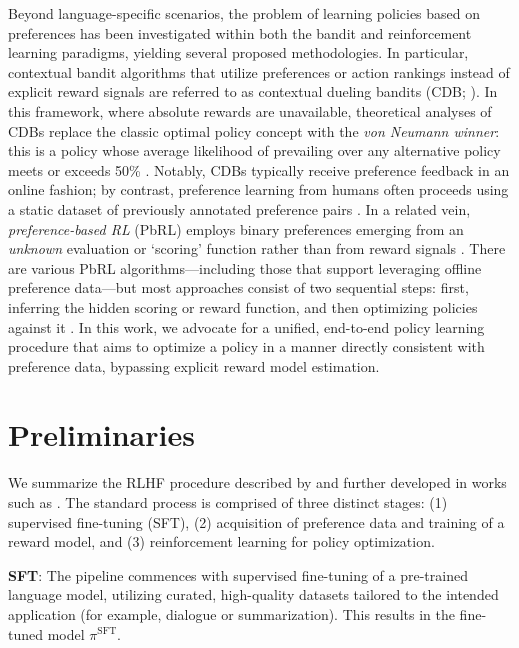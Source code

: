 Beyond language-specific scenarios, the problem of learning policies based on preferences has been investigated within both the bandit and reinforcement learning paradigms, yielding several proposed methodologies. In particular, contextual bandit algorithms that utilize preferences or action rankings instead of explicit reward signals are referred to as contextual dueling bandits (CDB; \cite{yue2012karmed,dudik2015contextual}). In this framework, where absolute rewards are unavailable, theoretical analyses of CDBs replace the classic optimal policy concept with the \textit{von Neumann winner}: this is a policy whose average likelihood of prevailing over any alternative policy meets or exceeds 50\% \citep{dudik2015contextual}. Notably, CDBs typically receive preference feedback in an online fashion; by contrast, preference learning from humans often proceeds using a static dataset of previously annotated preference pairs \citep{yan2022human}. In a related vein, \textit{preference-based RL} (PbRL) employs binary preferences emerging from an \textit{unknown} evaluation or ‘scoring’ function rather than from reward signals \citep{BusaFekete2014,ruiz2023dueling}. There are various PbRL algorithms—including those that support leveraging offline preference data—but most approaches consist of two sequential steps: first, inferring the hidden scoring or reward function, and then optimizing policies against it \citep{jain2013learning,BusaFekete2014,christiano2017deep,sadigh2017active,kupcsik2018learning}. In this work, we advocate for a unified, end-to-end policy learning procedure that aims to optimize a policy in a manner directly consistent with preference data, bypassing explicit reward model estimation.

\section{Preliminaries}\label{section:prelims}

We summarize the RLHF procedure described by \citeauthor{ziegler2020finetuning} and further developed in works such as \citep{stiennon2022learning, bai2022training, ouyang2022training}. The standard process is comprised of three distinct stages: (1) supervised fine-tuning (SFT), (2) acquisition of preference data and training of a reward model, and (3) reinforcement learning for policy optimization.

\textbf{SFT}: The pipeline commences with supervised fine-tuning of a pre-trained language model, utilizing curated, high-quality datasets tailored to the intended application (for example, dialogue or summarization). This results in the fine-tuned model $\pi^\text{SFT}$.

